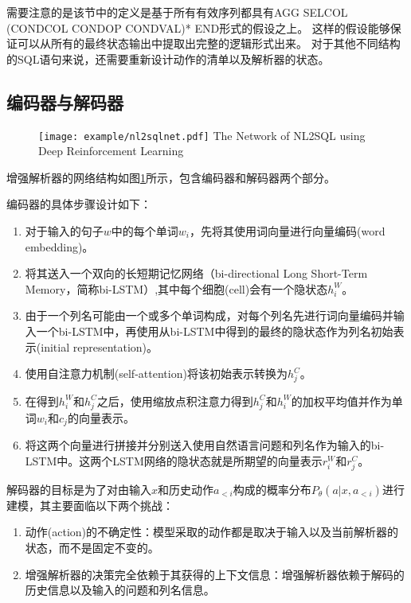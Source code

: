 需要注意的是该节中的定义是基于所有有效序列都具有AGG  SELCOL  (CONDCOL  CONDOP  CONDVAL)* END形式的假设之上。
这样的假设能够保证可以从所有的最终状态输出中提取出完整的逻辑形式出来。
对于其他不同结构的SQL语句来说，还需要重新设计动作的清单以及解析器的状态。

\subsection{编码器与解码器}
\label{enl2sql:encoder and decoder}

\begin{figure}[!htp]
  \centering
  \texttt{[image: example/nl2sqlnet.pdf]}
    {The Network of NL2SQL using Deep Reinforcement Learning}
  \label{fig:nl2sqlnet}
\end{figure}

增强解析器的网络结构如图\ref{fig:nl2sqlnet}所示，包含编码器和解码器两个部分。

编码器的具体步骤设计如下：
\begin{enumerate}
  \item 对于输入的句子$w$中的每个单词$w_i$，先将其使用词向量进行向量编码(word embedding)。
  \item 将其送入一个双向的长短期记忆网络（bi-directional Long Short-Term Memory，简称bi-LSTM）,其中每个细胞(cell)会有一个隐状态$h^W_i$。
  \item 由于一个列名可能由一个或多个单词构成，对每个列名先进行词向量编码并输入一个bi-LSTM中，再使用从bi-LSTM中得到的最终的隐状态作为列名初始表示(initial representation)。
  \item 使用自注意力机制(self-attention\cite{vaswani2017attention})将该初始表示转换为$h^C_j$。
  \item 在得到$h^W_i$和$h^C_j$之后，使用缩放点积注意力\cite{vaswani2017attention}得到$h^C_j$和$h^W_i$的加权平均值并作为单词$w_i$和$c_j$的向量表示。
  \item 将这两个向量进行拼接并分别送入使用自然语言问题和列名作为输入的bi-LSTM中。这两个LSTM网络的隐状态就是所期望的向量表示$r^W_i$和$r^C_j$。
\end{enumerate}

解码器的目标是为了对由输入$x$和历史动作$a_{<i}$构成的概率分布$P_{\theta}(a|x,a_{<i})$进行建模，其主要面临以下两个挑战：
\begin{enumerate}
  \item 动作(action)的不确定性：模型采取的动作都是取决于输入以及当前解析器的状态，而不是固定不变的。
  \item 增强解析器的决策完全依赖于其获得的上下文信息：增强解析器依赖于解码的历史信息以及输入的问题和列名信息。
\end{enumerate}


